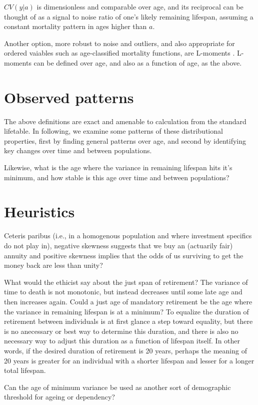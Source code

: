 \documentclass{article}
\begin{document}
\noindent $CV(y|a)$ is dimensionless and comparable over age, and its reciprocal
can be thought of as a signal to noise ratio of one's likely remaining lifespan,
assuming a constant mortality pattern in ages higher than $a$.

Another option, more robust to noise and outliers, and also appropriate for
ordered vaiables such as age-classified mortality functions, are L-moments
\citep{hosking1990moments}. L-moments can be defined over age, and also as a
function of age, as the above.

\section{Observed patterns}
The above definitions are exact and amenable to calculation from the standard
lifetable. In following, we examine some patterns of these distributional
properties, first by finding general patterns over age, and second by
identifying key changes over time and between populations.

Likewise, what is the age where the variance in remaining lifespan hits it's
minimum, and how stable is this age over time and between populations?

\section{Heuristics}
Ceteris paribus (i.e., in a homogenous population and where investment
specifics do not play in), negative skewness suggests that we buy an (actuarily
fair) annuity and positive skewness implies that the odds of us surviving to get 
the money back are less than unity?

What would the ethicist say about the just span of retirement? The variance of
time to death is not monotonic, but instead decreases until some late age and
then increases again. Could a just age of mandatory retirement be the age where
the variance in remaining lifespan is at a minimum? To equalize the duration of
retirement between individuals is at first glance a step toward equality, but
there is no anecessary or best way to determine this duration, and there is also
no necessary way to adjust this duration as a function of lifespan itself. In
other words, if the desired duration of retirement is 20 years, perhaps the
meaning of 20 years is greater for an individual with a shorter lifespan and
lesser for a longer total lifespan.

Can the age of minimum variance be used as another sort of demographic threshold
for ageing or dependency?
\end{document}
